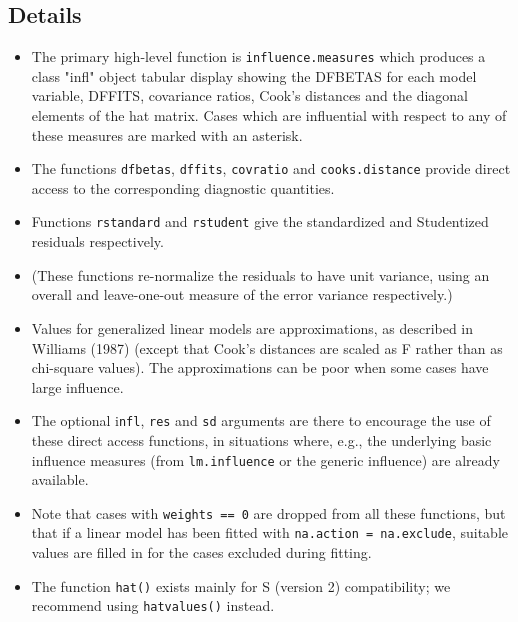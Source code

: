 \documentclass[residuals.tex]{subfiles}
\begin{document}
\subsection*{Details}
\begin{itemize}
	\item The primary high-level function is \texttt{influence.measures} which produces a class "infl" object tabular display showing the DFBETAS for each model variable, DFFITS, covariance ratios, Cook's distances and the diagonal elements of the hat matrix. Cases which are influential with respect to any of these measures are marked with an asterisk. 
	
	\item The functions \texttt{dfbetas}, \texttt{dffits}, \texttt{covratio} and \texttt{cooks.distance} provide direct access to the corresponding diagnostic quantities. 
	
	\item Functions \texttt{rstandard} and \texttt{rstudent} give the standardized and Studentized residuals respectively. 
	
	\item (These functions re-normalize the residuals to have unit variance, using an overall and leave-one-out measure of the error variance respectively.) 
	
	\item Values for generalized linear models are approximations, as described in Williams (1987) (except that Cook's distances are scaled as F rather than as chi-square values). The approximations can be poor when some cases have large influence. 
	
	\item The optional i\texttt{nfl}, \texttt{res} and \texttt{sd} arguments are there to encourage the use of these direct access functions, in situations where, e.g., the underlying basic influence measures (from \texttt{lm.influence} or the generic influence) are already available. 
	
	\item Note that cases with \texttt{weights == 0} are dropped from all these functions, but that if a linear model has been fitted with \texttt{na.action = na.exclude}, suitable values are filled in for the cases excluded during fitting. 
	
	\item 
	The function \texttt{hat()} exists mainly for S (version 2) compatibility; we recommend using \texttt{hatvalues()} instead. 
\end{itemize}
\end{document}
